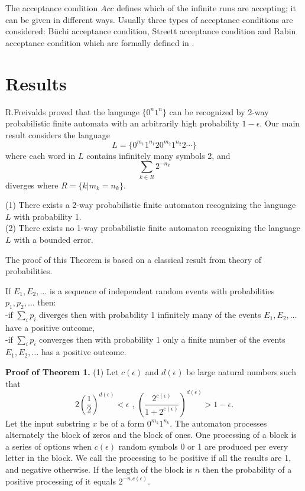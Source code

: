 \documentclass{llncs}
\begin{document}
The acceptance condition $Acc$ defines which of the infinite runs are accepting; it can be given in different ways. Usually three types of acceptance conditions are considered: B\"uchi acceptance condition, Streett acceptance condition and Rabin acceptance condition which are formally defined in \cite{BG05,SP02}.

\bigskip

\section{Results}

R.Freivalds \cite{F81} proved that the language $\{0^n1^n\}$ can be recognized by 2-way probabilistic finite automata with an arbitrarily high probability
 $1 - \epsilon $. Our main result considers the language
$$
L = \{0^{m_1}1^{n_1}20^{m_2}1^{n_2}2\cdots \}
$$
where  each word in $L$ contains infinitely many symbols 2, and 
$$
\sum_{k \in R}{2^{-n_k}}
$$
diverges where $R = \{ k | m_k = n_k \}$.
  
 
 
 
\bigskip 
 
\begin{theorem}
(1) There exists a 2-way probabilistic finite automaton recognizing  the language $L$ with probability 1.\\
(2) There exists no 1-way probabilistic finite automaton recognizing  the language $L$ with a bounded error.
\end{theorem}


\bigskip

The proof of this Theorem is based on a classical result from theory of probabilities.

\bigskip


If $E_1, E_2, \ldots $ is a sequence of independent random events with probabilities  
$p_1, p_2, \ldots $ then:\\
-if $\sum _i p_i$ diverges then with probability 1 infinitely many of the events $E_1, E_2, \ldots $ have a positive outcome,\\
-if $\sum _i p_i$ converges then with probability 1 only a finite number of the events $E_1, E_2, \ldots $ has a positive outcome.


\bigskip



{\bf Proof of Theorem 1.} (1)  Let $c(\epsilon )$ and $d(\epsilon )$ be large natural numbers such that
$$ 
2(\frac{1}{2})^{d(\epsilon )} < \epsilon \mbox{       ,        }  (\frac{2^{c(\epsilon )}}{1+2^{c(\epsilon )}})^{d(\epsilon )} > 1-\epsilon .
$$
Let the input substring $x$ be of a form $0^{m_k}1^{n_k}$. The automaton processes alternately the block of zeros and the block of ones.
One processing of a block is a series of options when $c(\epsilon )$ random symbols 0 or 1 are produced per every letter in the block.
We call the processing to be positive if all the results are 1, and negative otherwise. If the length of the block is $n$ then the probability of a 
positive processing of it equals $2^{-n.c(\epsilon )}$.
\end{document}
